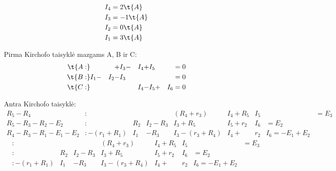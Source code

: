 \begin{exmp}
  \begin{align*}
    I_{4} &= 2 \t{A} \\
    I_{3} &= -1 \t{A} \\
    I_{2} &= 0 \t{A} \\
    I_{1} &= 3 \t{A}
  \end{align*}
\end{exmp}

\begin{exmp}

  Pirma Kirchofo taisyklė mazgams A, B ir C:
  \begin{align*}
    \t{A:}&  & + &I_{3} - &I_{4} + &I_{5} & &= 0 \\
    \t{B:} &I_{1} - &I_{2} - &I_{3} &&& &= 0\\
    \t{C:} &&&  &I_{4} - &I_{5} + &I_{6} &= 0
  \end{align*}

  Antra Kirchofo taisyklė:
  \begin{align*}
    R_{5}-R_{4}&: &&& (R_{4} + r_{3}) &I_{4} + R_{5}&I_{5} & &= E_{3} \\
    R_{5}-R_{3}-R_{2}-E_{2}&:
      & R_{2} &I_{2} - R_{3}&I_{3} + R_{5} &I_{5} + r_{2} &I_{6} &= E_{2} \\
    R_{4}-R_{3}-R_{1}-E_{1}-E_{2}&:
      -(r_{1} + R_{1}) &I_{1} & - R_{3} &I_{3} -
      (r_{3} + R_{4})&I_{4} + &r_{2} &I_{6} = -E_{1} + E_{2}
  \end{align*}
  \begin{align*}
    &:                  &             &              &        (R_{4} + r_{3}) &I_{4}  + R_{5}&I_{5} & &= E_{3} \\
    &:                  &       R_{2} &I_{2}  - R_{3}&I_{3}                           + R_{5}&I_{5} + r_{2} &I_{6} &= E_{2} \\
    &: -(r_{1} + R_{1}) &I_{1}        &       - R_{3}&I_{3} - (r_{3} + R_{4})&I_{4} + &r_{2} &I_{6} = -E_{1} + E_{2}
  \end{align*}

  
\end{exmp}
